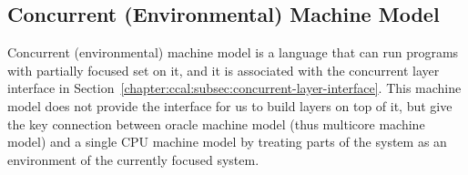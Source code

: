 

\subsection{Concurrent (Environmental) Machine Model}
\label{chapter:linking:subsec:concurrent-machine-model}

Concurrent (environmental) machine model is a language that can run programs with partially focused set on it,
and it is associated with the concurrent layer interface in Section~\ref{chapter:ccal:subsec:concurrent-layer-interface}. 
This machine model does not provide the interface for us to build layers on top of it, but give the key connection between oracle machine model (thus multicore machine model) and a single CPU machine model
by treating parts of the system as an environment of the currently focused system. 

